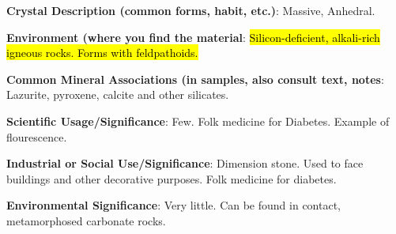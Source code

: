 \documentclass[10pt]{article}
\begin{document}
\begin{framed}
  \textbf{Crystal Description (common forms, habit, etc.)}:  Massive, Anhedral. 
\end{framed}

\begin{framed}
  \textbf{Environment (where you find the material}:  \hl{Silicon-deficient, alkali-rich igneous rocks. Forms with feldpathoids.}
\end{framed}


\begin{framed}
  \textbf{Common Mineral Associations (in samples, also consult text, notes}: Lazurite, pyroxene, calcite and other silicates.
\end{framed}

\begin{framed}
  \textbf{Scientific Usage/Significance}: Few. Folk medicine for Diabetes. Example of flourescence. 
\end{framed}

\begin{framed}
  \textbf{Industrial or Social Use/Significance}:  Dimension stone. Used to face
buildings and other decorative purposes. Folk medicine for diabetes.
\end{framed}

\begin{framed}
  \textbf{Environmental Significance}: Very little. Can be found in contact, metamorphosed carbonate rocks.
\end{framed}


\end{document}
